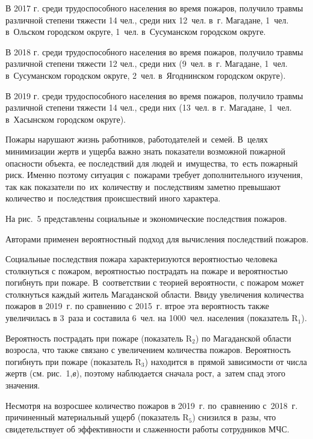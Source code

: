 В 2017 г. среди трудоспособного населения во время пожаров, получило травмы различной степени тяжести 14 чел., среди них 12~чел. в~г. Магадане, 1~чел. в~Ольском городском округе, 1~чел. в~Сусуманском городском округе.

В 2018 г. среди трудоспособного населения во время пожаров, получило травмы различной степени тяжести 12 чел., среди них (9~чел. в~г. Магадане, 1~чел. в~Сусуманском городском округе, 2~чел. в~Ягоднинском городском округе).

В 2019 г. среди трудоспособного населения во время пожаров, получило травмы различной степени тяжести 14 чел., среди них (13~чел. в~г. Магадане, 1~чел. в~Хасынском городском округе).

Пожары нарушают жизнь работников, работодателей и~семей. В~целях
минимизации жертв и ущерба важно знать показатели возможной пожарной
опасности объекта, ее последствий для людей и~имущества, то~есть
пожарный риск. Именно поэтому ситуация с~пожарами требует
дополнительного изучения, так как показатели по~их~количеству и~последствиям заметно превышают количество и~последствия происшествий
иного характера.

На рис.~5 представлены социальные и экономические последствия пожаров.



Авторами применен вероятностный подход для вычисления последствий
пожаров.

Социальные последствия пожара характеризуются вероятностью человека
столкнуться с пожаром, вероятностью пострадать на пожаре и вероятностью
погибнуть при пожаре. В~соответствии с теорией вероятности, с пожаром
может столкнуться каждый житель Магаданской области. Ввиду увеличения
количества пожаров в 2019~г. по сравнению с 2015~г. втрое эта
вероятность также увеличилась в 3~раза и составила 6~чел. на 1000~чел.
населения (показатель R$_1$).

Вероятность пострадать при пожаре (показатель R$_2$) по Магаданской
области возросла, что также связано с увеличением количества пожаров.
Вероятность погибнуть при пожаре (показатель R$_3$) находится в~прямой
зависимости от числа жертв (см. рис.~1,\textit{в}), поэтому наблюдается сначала
рост, а~затем спад этого значения.

Несмотря на возросшее количество пожаров в 2019~г. по~сравнению с~2018~г. причиненный материальный ущерб (показатель R$_5$) снизился в~разы, что свидетельствует об эффективности и слаженности работы сотрудников МЧС.

